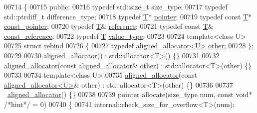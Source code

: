 \begin{DoxyCode}
{00714 \{
00715 \textcolor{keyword}{public}:
00716   \textcolor{keyword}{typedef} std::size\_t     size\_type;
00717   \textcolor{keyword}{typedef} std::ptrdiff\_t  difference\_type;
00718   \textcolor{keyword}{typedef} \hyperlink{group___sparse_core___module}{T}*              \hyperlink{group___sparse_core___module}{pointer};
00719   \textcolor{keyword}{typedef} \textcolor{keyword}{const} \hyperlink{group___sparse_core___module}{T}*        \hyperlink{group___sparse_core___module}{const\_pointer};
00720   \textcolor{keyword}{typedef} \hyperlink{group___sparse_core___module}{T}&              \hyperlink{group___sparse_core___module}{reference};
00721   \textcolor{keyword}{typedef} \textcolor{keyword}{const} \hyperlink{group___sparse_core___module}{T}&        \hyperlink{group___sparse_core___module}{const\_reference};
00722   \textcolor{keyword}{typedef} \hyperlink{group___sparse_core___module}{T}               \hyperlink{group___sparse_core___module}{value\_type};
00723 
00724   \textcolor{keyword}{template}<\textcolor{keyword}{class} U>
\hyperlink{struct_eigen_1_1aligned__allocator_1_1rebind}{00725}   \textcolor{keyword}{struct }\hyperlink{struct_eigen_1_1aligned__allocator_1_1rebind}{rebind}
00726   \{
00727     \textcolor{keyword}{typedef} \hyperlink{group___core___module_class_eigen_1_1aligned__allocator}{aligned\_allocator<U>} \hyperlink{group___core___module_class_eigen_1_1aligned__allocator}{other};
00728   \};
00729 
00730   \hyperlink{group___core___module_class_eigen_1_1aligned__allocator}{aligned\_allocator}() : std::allocator<T>() \{\}
00731 
00732   \hyperlink{group___core___module_class_eigen_1_1aligned__allocator}{aligned\_allocator}(\textcolor{keyword}{const} \hyperlink{group___core___module_class_eigen_1_1aligned__allocator}{aligned\_allocator}& 
      \hyperlink{group___core___module_class_eigen_1_1aligned__allocator}{other}) : std::allocator<T>(other) \{\}
00733 
00734   \textcolor{keyword}{template}<\textcolor{keyword}{class} U>
00735   \hyperlink{group___core___module_class_eigen_1_1aligned__allocator}{aligned\_allocator}(\textcolor{keyword}{const} \hyperlink{group___core___module_class_eigen_1_1aligned__allocator}{aligned\_allocator<U>}& other) : 
      std::allocator<T>(other) \{\}
00736 
00737   ~\hyperlink{group___core___module_class_eigen_1_1aligned__allocator}{aligned\_allocator}() \{\}
00738 
00739   pointer allocate(size\_type num, \textcolor{keyword}{const} \textcolor{keywordtype}{void}* \textcolor{comment}{/*hint*/} = 0)
00740   \{
00741     internal::check\_size\_for\_overflow<T>(num);
}
\end{DoxyCode}
